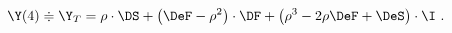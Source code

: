\begin{equation}
  \label{eq:Y4}
  \Y(4) \doteqdot \Y_T = \rho\cdot\DS + \left(\DeF-\rho^2\right)\cdot\DF + \left(\rho^3-2\rho\DeF +
    \DeS\right)\cdot\I\ .
\end{equation}

